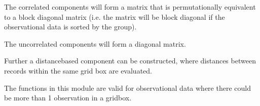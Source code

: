 \documentclass[letterpaper,10pt,english]{sphinxmanual}
\begin{document}
\sphinxAtStartPar
The correlated components will form a matrix that is permutationally equivalent
to a block diagonal matrix (i.e. the matrix will be block diagonal if the
observational data is sorted by the group).

\sphinxAtStartPar
The uncorrelated components will form a diagonal matrix.

\sphinxAtStartPar
Further a distance\sphinxhyphen{}based component can be constructed, where distances between
records within the same grid box are evaluated.

\sphinxAtStartPar
The functions in this module are valid for observational data where there could
be more than 1 observation in a gridbox.
\end{document}
